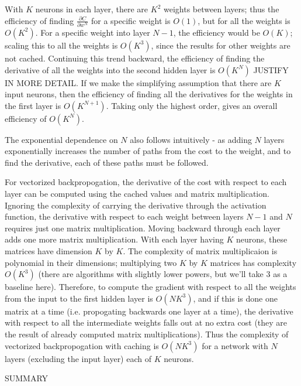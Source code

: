 \documentclass{article}
\begin{document}
   With $K$ neurons in each layer, there are $K^2$ weights between layers; thus the efficiency of
   finding $ \frac{ \partial C}{ \partial w^{N} } $ for a specific weight is $O(1)$, but for
   all the weights is $O(K^2)$.
   For a specific weight into layer $N-1$, the efficiency would be $O(K)$; scaling this to
   all the weights is $O(K^3)$, since the results for other weights are not cached.
   Continuing this trend backward, the efficiency of finding the derivative of all the weights
   into the second hidden layer is $O(K^{N})$ JUSTIFY IN MORE DETAIL.
   If we make the simplifying assumption that there are $K$ input neurons, then the efficiency
   of finding all the derivatives for the weights in the first layer is $O(K^{N+1})$.
   Taking only the highest order, gives an overall efficiency of $O(K^{N})$.

   The exponential dependence on $N$ also follows intuitively - as adding $N$ layers
   exponentially increases the number of paths from the cost to the weight, and to find
   the derivative, each of these paths must be followed.

   For vectorized backpropogation, the derivative of the cost with respect to each layer
   can be computed using the cached values and matrix multiplication. Ignoring the complexity
   of carrying the derivative through the activation function, the derivative with respect to
   each weight between layers $N-1$ and $N$ requires just one matrix multiplication.
   Moving backward through each layer adds one more matrix multiplication.
   With each layer having $K$ neurons, these matrices have dimension $K$ by $K$.
   The complexity of matrix multiplicaion is polynomial in their dimensions; multiplying two
   $K$ by $K$ matrices has complexity $O(K^3)$ (there are algorithms with slightly lower powers,
   but we'll take $3$ as a baseline here). Therefore, to compute the gradient with respect to all
   the weights from the input to the first hidden layer is $O(N K^3)$, and if this is done
   one matrix at a time (i.e. propogating backwards one layer at a time), the derivative
   with respect to all the intermediate weights falls out at no extra cost (they are the
   result of already computed matrix multiplications).
   Thus the complexity of vectorized backpropogation with caching is $O(N K^3)$ for a
   network with $N$ layers (excluding the input layer) each of $K$ neurons.

   SUMMARY
\end{document}
